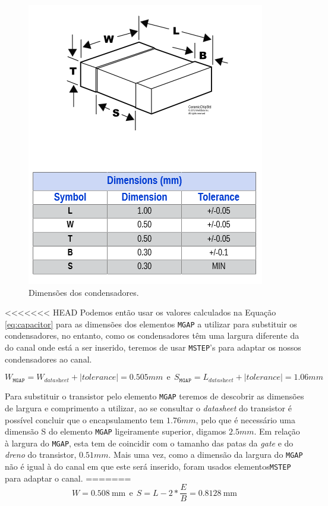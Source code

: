 \documentclass[11pt]{article}
\numberwithin{equation}{section}
\begin{document}
\begin{figure}[H]
	\centering
	\includegraphics[keepaspectratio=true, scale=0.45]{teoricas/capacitor}
	\vspace{-0.5em}
	\caption{Dimensões dos condensadores.}
	\vspace{-0.8em}
	\label{fig:capacitor}
\end{figure}

<<<<<<< HEAD
Podemos então usar os valores calculados na Equação \ref{eq:capacitor} para as dimensões dos elementos \texttt{MGAP} a utilizar para substituir os condensadores, no entanto, como os condensadores têm uma largura diferente da do canal onde está a ser inserido, teremos de usar \texttt{MSTEP}'s para adaptar os nossos condensadores ao canal.

\begin{equation}
W_{\texttt{MGAP}} = W_{\textit{datasheet}} + |tolerance| = 0.505 mm ~~ \text{e} ~~ S_{\texttt{MGAP}} = L_{\textit{datasheet}} + |tolerance| = 1.06 mm
\label{eq:capacitor}
\end{equation}

Para substituir o transistor pelo elemento \texttt{MGAP} teremos de descobrir as dimensões de largura e comprimento a utilizar, ao se consultar o \textit{datasheet} do transistor é possível  concluir que o encapsulamento tem $ 1.76 mm $, pelo que é necessário uma dimensão S do elemento \texttt{MGAP} ligeiramente superior, digamos $ 2.5 mm $. Em relação à largura do \texttt{MGAP}, esta tem de coincidir com o tamanho das patas da \textit{gate} e do \textit{dreno} do transistor, $ 0.51 mm $. Mais uma vez, como a dimensão da largura do \texttt{MGAP} não é igual à do canal em que este será inserido, foram usados elementos\texttt{MSTEP} para adaptar o canal.
=======
\vspace{-3mm}
\begin{equation}
W = 0.508~\text{mm} ~~ \text{e} ~~ S = L - 2*\frac{E}{B} = 0.8128~\text{mm}
\label{eq:capacitor}
\end{equation}
\end{document}
